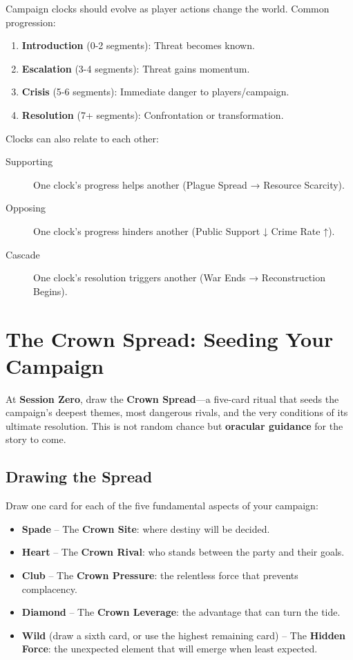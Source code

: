 Campaign clocks should evolve as player actions change the world. Common progression:
\begin{enumerate}
  \item \textbf{Introduction} (0-2 segments): Threat becomes known.
  \item \textbf{Escalation} (3-4 segments): Threat gains momentum.
  \item \textbf{Crisis} (5-6 segments): Immediate danger to players/campaign.
  \item \textbf{Resolution} (7+ segments): Confrontation or transformation.
\end{enumerate}

Clocks can also relate to each other:
\begin{description}
  \item[Supporting] One clock's progress helps another (Plague Spread → Resource Scarcity).
  \item[Opposing] One clock's progress hinders another (Public Support ↓ Crime Rate ↑).
  \item[Cascade] One clock's resolution triggers another (War Ends → Reconstruction Begins).
\end{description}

\section{The Crown Spread: Seeding Your Campaign}
\label{sec:crown-spread}

At \textbf{Session Zero}, draw the \textbf{Crown Spread}—a five-card ritual that seeds the campaign’s deepest themes, most dangerous rivals, and the very conditions of its ultimate resolution. This is not random chance but \textbf{oracular guidance} for the story to come.

\subsection{Drawing the Spread}
\label{subsec:crown-drawing}

Draw one card for each of the five fundamental aspects of your campaign:
\begin{itemize}
    \item \textbf{Spade} – The \textbf{Crown Site}: where destiny will be decided.
    \item \textbf{Heart} – The \textbf{Crown Rival}: who stands between the party and their goals.
    \item \textbf{Club} – The \textbf{Crown Pressure}: the relentless force that prevents complacency.
    \item \textbf{Diamond} – The \textbf{Crown Leverage}: the advantage that can turn the tide.
    \item \textbf{Wild} (draw a sixth card, or use the highest remaining card) – The \textbf{Hidden Force}: the unexpected element that will emerge when least expected.
\end{itemize}


